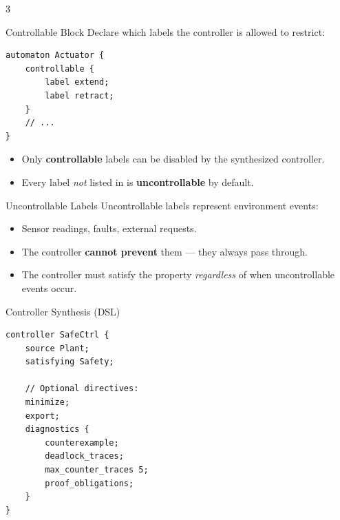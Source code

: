 



\begin{multicols}{3}
\footnotesize


\begin{cheatbox}{Controllable Block}
Declare which labels the controller is allowed to restrict:

\begin{lstlisting}[style=ctxdsl]
automaton Actuator {
    controllable {
        label extend;
        label retract;
    }
    // ...
}
\end{lstlisting}

\begin{itemize}
  \item Only \textbf{controllable} labels can be disabled
        by the synthesized controller.
  \item Every label \emph{not} listed in 
        is \textbf{uncontrollable} by default.
\end{itemize}
\end{cheatbox}

\begin{cheatbox}{Uncontrollable Labels}
Uncontrollable labels represent environment events:

\begin{itemize}
  \item Sensor readings, faults, external requests.
  \item The controller \textbf{cannot prevent} them ---
        they always pass through.
  \item The controller must satisfy the property
        \emph{regardless} of when uncontrollable events
        occur.
\end{itemize}
\end{cheatbox}

\columnbreak


\begin{cheatbox}{Controller Synthesis (DSL)}
\begin{lstlisting}[style=ctxdsl]
controller SafeCtrl {
    source Plant;
    satisfying Safety;

    // Optional directives:
    minimize;
    export;
    diagnostics {
        counterexample;
        deadlock_traces;
        max_counter_traces 5;
        proof_obligations;
    }
}
\end{lstlisting}


\end{cheatbox}
\end{multicols}
